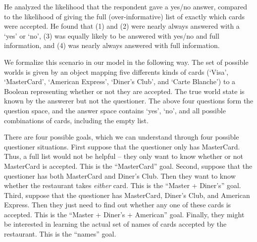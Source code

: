 \documentclass[12pt, floatsintext, jou]{apa6}
\begin{document}
He analyzed the likelihood that the respondent gave a yes/no answer, compared to the likelihood of giving the full (over-informative) list of exactly which cards were accepted.  He found that (1) and (2) were nearly always answered with a `yes' or `no', (3) was equally likely to be answered with yes/no and full information, and (4) was nearly always answered with full information. 

We formalize this scenario in our model in the following way. The set of possible worlds is given by an object mapping five differents kinds of cards (`Visa', `MasterCard', `American Express', `Diner's Club', and `Carte Blanche') to a Boolean representing whether or not they are accepted. The true world state is known by the answerer but not the questioner. The above four questions form the question space, and the answer space contains `yes', `no', and all possible combinations of cards, including the empty list.

There are four possible goals, which we can understand through four possible questioner situations. First suppose that the questioner only has MasterCard. Thus, a full list would not be helpful -- they only want to know whether or not MasterCard is accepted. This is the ``MasterCard'' goal. Second, suppose that the questioner has both MasterCard and Diner's Club. Then they want to know whether the restaurant takes \emph{either} card. This is the ``Master + Diner's'' goal. Third, suppose that the questioner has MasterCard, Diner's Club, and American Express. Then they just need to find out whether any one of these cards is accepted. This is the ``Master + Diner's + American'' goal. Finally, they might be interested in learning the actual set of names of cards accepted by the restaurant. This is the ``names'' goal. 

\end{document}
